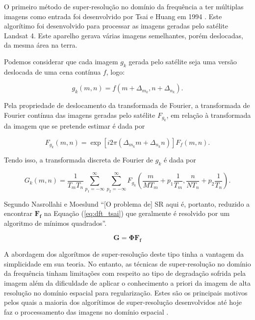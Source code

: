 O primeiro método de super-resolução no domínio da frequência a ter múltiplas imagens como entrada foi desenvolvido por Tsai e Huang em 1994 \cite{nasrollahi2014super}.
Este algorítimo foi desenvolvido para processar as imagens geradas pelo satélite Landsat 4.
Este aparelho gerava várias imagens semelhantes, porém deslocadas, da mesma área na
terra.

Podemos considerar que cada imagem $g_k$ gerada pelo satélite seja uma versão deslocada de uma cena contínua $f$, logo:

\begin{equation}
	g_k(m,n) = f(m + \Delta_{m_k}, n + \Delta_{n_k}).
\end{equation}

Pela propriedade de deslocamento da transformada de Fourier, a transformada de Fourier contínua das imagens geradas pelo satélite $F_{g_k}$, em relação à transformada da imagem que se pretende estimar é dada por

\begin{equation}
	F_{g_k} (m,n) = \exp{[i2\pi (\Delta_{m_k}m + \Delta_{n_k}n)]} F_f (m,n).
\end{equation}

Tendo isso, a transformada discreta de Fourier de $g_k$ é dada por

\begin{equation}
	G_k(m,n) = \frac{1}{T_m T_n} \sum^\infty_{p_1=-\infty} \sum^\infty_{p_2=-\infty}
	F_{g_k} \left( \frac{m}{MT_m} + p_1 \frac{1}{T_m},
	\frac{n}{NT_n} + p_2\frac{1}{T_n} \right).
\end{equation}

Segundo Nasrollahi e Moeslund \cite{nasrollahi2014super} ``[O problema de] SR aqui é, portanto, reduzido a encontrar $\mathbf{ F_f}$ na Equação (\ref{eq:dft_tsai}) que geralmente é resolvido por um algoritmo de mínimos quadrados''.

\begin{equation}
	\label{eq:dft_tsai}
	\mathbf{G} = \mathbf{\Phi F_f}
\end{equation}

A abordagem dos algorítmos de super-resolução deste tipo tinha a vantagem da simplicidade em sua teoria.
No entanto, as técnicas de super-resolução no domínio da frequência tinham limitações com respeito ao tipo de degradação sofrida pela imagem além da dificuldade de aplicar o conhecimento a priori da imagem de alta resolução no domínio espacial para regularização.
Estes são os principais motivos pelos quais a maioria dos algorítimos de super-resolução desenvolvidos até hoje faz o processamento das imagens no domínio espacial \cite{park2003super}.

